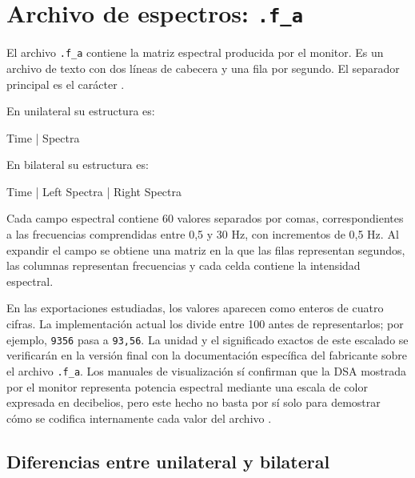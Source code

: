 \documentclass[
  spanish,
  a4paper,
  12pt,
  twoside]{memoir}
\newenvironment{Shaded}{\begin{snugshade}}{\end{snugshade}}
\newcommand{\NormalTok}[1]{\textcolor[rgb]{0.00,0.23,0.31}{#1}}
\begin{document}
\chapter{\texorpdfstring{Archivo de espectros:
\texttt{.f\_a}}{Archivo de espectros: .f\_a}}\label{archivo-de-espectros-.f_a}

El archivo \texttt{.f\_a} contiene la matriz espectral producida por el
monitor. Es un archivo de texto con dos líneas de cabecera y una fila
por segundo. El separador principal es el carácter \texttt{\textbar{}}.

En unilateral su estructura es:

\begin{Shaded}
\begin{Highlighting}[]
\NormalTok{Time | Spectra}
\end{Highlighting}
\end{Shaded}

En bilateral su estructura es:

\begin{Shaded}
\begin{Highlighting}[]
\NormalTok{Time | Left Spectra | Right Spectra}
\end{Highlighting}
\end{Shaded}

Cada campo espectral contiene 60 valores separados por comas,
correspondientes a las frecuencias comprendidas entre 0,5 y 30 Hz, con
incrementos de 0,5 Hz. Al expandir el campo se obtiene una matriz en la
que las filas representan segundos, las columnas representan frecuencias
y cada celda contiene la intensidad espectral.

En las exportaciones estudiadas, los valores aparecen como enteros de
cuatro cifras. La implementación actual los divide entre 100 antes de
representarlos; por ejemplo, \texttt{9356} pasa a \texttt{93,56}. La
unidad y el significado exactos de este escalado se verificarán en la
versión final con la documentación específica del fabricante sobre el
archivo \texttt{.f\_a}. Los manuales de visualización sí confirman que
la DSA mostrada por el monitor representa potencia espectral mediante
una escala de color expresada en decibelios, pero este hecho no basta
por sí solo para demostrar cómo se codifica internamente cada valor del
archivo \citep{CovidienBISadvanced}.

\section{Diferencias entre unilateral y
bilateral}\label{diferencias-entre-unilateral-y-bilateral-1}
\end{document}

